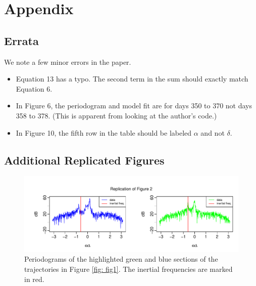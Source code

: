 \documentclass{stat572Style}
\begin{document}
\clearpage




\section{Appendix}

\subsection{Errata}
We note a few minor errors in the paper.
\begin{itemize}
\item Equation 13 has a typo. The second term in the sum should exactly match Equation 6. 
\item In Figure 6, the periodogram and model fit are for days 350 to 370 not days 358 to 378. (This is apparent from looking at the author's code.)
\item In Figure 10, the fifth row in the table should be labeled $\alpha$ and not $\delta$.
\end{itemize} 

\subsection{Additional Replicated Figures}

\begin{figure}[h!]
  \centering
    \includegraphics[width=\textwidth]{ReplicatedFigures/fig2.pdf}
        \caption{Periodograms of the highlighted green and blue sections of the trajectories in Figure \ref{fig: fig1}. The inertial frequencies are marked in red. }
        	\label{fig: fig2}
\end{figure}
\end{document}
